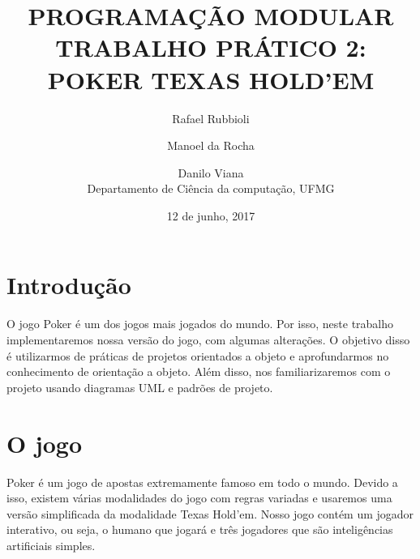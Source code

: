 \documentclass[12pt]{article}
\title{\LARGE \textbf{\uppercase{Programação modular\\Trabalho prático 2: Poker Texas Hold'em}} }
\date{12 de junho, 2017}
\author{Rafael Rubbioli\\
\and Manoel da Rocha\\
\and Danilo Viana\\ Departamento de Ciência da computação, UFMG}
\begin{document}
	\begin{titlepage}
		\maketitle
	\end{titlepage}
	\section{Introdução}
	O jogo Poker é um dos jogos mais jogados do mundo. Por isso, neste trabalho implementaremos nossa versão do jogo, com algumas alterações. O objetivo disso é utilizarmos de práticas de projetos orientados a objeto e aprofundarmos no conhecimento de orientação a objeto. Além disso, nos familiarizaremos com o projeto usando diagramas UML e padrões de projeto.
	\section{O jogo}
	Poker é um jogo de apostas extremamente famoso em todo o mundo. Devido a isso, existem várias modalidades do jogo com regras variadas e usaremos uma versão simplificada da modalidade Texas Hold'em. 
    Nosso jogo contém um jogador interativo, ou seja, o humano que jogará e três jogadores que são inteligências
    artificiais simples.
\end{document}
